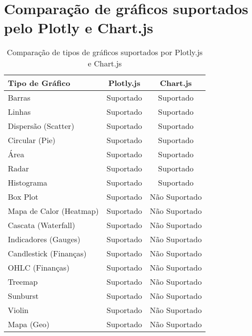 \chapter{Comparação de gráficos suportados pelo Plotly e Chart.js}
\label{ch:charts}

\begin{table}[H]
\centering
\caption{Comparação de tipos de gráficos suportados por Plotly.js e Chart.js}
\begin{tabular}{|l|c|c|}
\hline
\textbf{Tipo de Gráfico} & \textbf{Plotly.js} & \textbf{Chart.js} \\
\hline
Barras                         & Suportado & Suportado \\
Linhas                         & Suportado & Suportado \\
Dispersão (Scatter)            & Suportado & Suportado \\
Circular (Pie)                 & Suportado & Suportado \\
Área                           & Suportado & Suportado \\
Radar                          & Suportado & Suportado \\
Histograma                     & Suportado & Suportado \\
Box Plot                       & Suportado & Não Suportado \\
Mapa de Calor (Heatmap)        & Suportado & Não Suportado \\
Cascata (Waterfall)            & Suportado & Não Suportado \\
Indicadores (Gauges)           & Suportado & Não Suportado \\
Candlestick (Finanças)         & Suportado & Não Suportado \\
OHLC (Finanças)                & Suportado & Não Suportado \\
Treemap                        & Suportado & Não Suportado \\
Sunburst                       & Suportado & Não Suportado \\
Violin                         & Suportado & Não Suportado \\
Mapa (Geo)                     & Suportado & Não Suportado \\
\hline
\end{tabular}
\label{tab:charts}
\end{table}